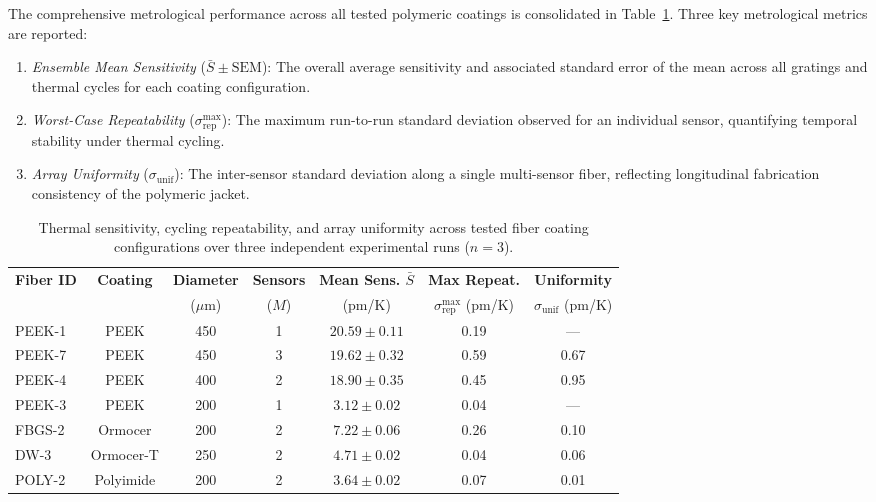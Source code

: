 \documentclass[12pt]{article}
\begin{document}
The comprehensive metrological performance across all tested polymeric coatings is consolidated in Table~\ref{tab:repeatability_summary}. Three key metrological metrics are reported:
\begin{enumerate}
    \item \textit{Ensemble Mean Sensitivity} ($\bar{S} \pm \text{SEM}$): The overall average sensitivity and associated standard error of the mean across all gratings and thermal cycles for each coating configuration.
    \item \textit{Worst-Case Repeatability} ($\sigma_{\text{rep}}^{\max}$): The maximum run-to-run standard deviation observed for an individual sensor, quantifying temporal stability under thermal cycling.
    \item \textit{Array Uniformity} ($\sigma_{\text{unif}}$): The inter-sensor standard deviation along a single multi-sensor fiber, reflecting longitudinal fabrication consistency of the polymeric jacket.
\end{enumerate}

\begin{table}[htpb]
    \centering
    \small
    \setlength{\tabcolsep}{4.5pt}
    \caption{Thermal sensitivity, cycling repeatability, and array uniformity across tested fiber coating configurations over three independent experimental runs ($n = 3$).}
    \label{tab:repeatability_summary}
    \begin{tabular}{lcccccc}
        \toprule
        \textbf{Fiber ID} & \textbf{Coating} & \textbf{Diameter} & \textbf{Sensors} & \textbf{Mean Sens. $\bar{S}$} & \textbf{Max Repeat.} & \textbf{Uniformity} \\
        & & ($\mu\text{m}$) & ($M$) & (pm/K) & $\sigma_{\text{rep}}^{\max}$ (pm/K) & $\sigma_{\text{unif}}$ (pm/K) \\
        \midrule
        PEEK-1  & PEEK      & 450 & 1 & $20.59 \pm 0.11$ & 0.19 & --- \\
        PEEK-7  & PEEK      & 450 & 3 & $19.62 \pm 0.32$ & 0.59 & 0.67 \\
        PEEK-4  & PEEK      & 400 & 2 & $18.90 \pm 0.35$ & 0.45 & 0.95 \\
        PEEK-3  & PEEK      & 200 & 1 & $3.12 \pm 0.02$  & 0.04 & --- \\
        FBGS-2  & Ormocer   & 200 & 2 & $7.22 \pm 0.06$  & 0.26 & 0.10 \\
        DW-3    & Ormocer-T & 250 & 2 & $4.71 \pm 0.02$  & 0.04 & 0.06 \\
        POLY-2  & Polyimide & 200 & 2 & $3.64 \pm 0.02$  & 0.07 & 0.01 \\
        \bottomrule
    \end{tabular}
\end{table}
\end{document}
